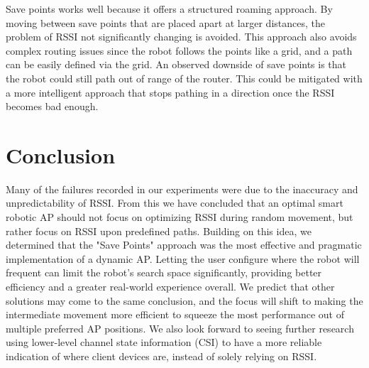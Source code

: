 Save points works well because it offers a structured roaming approach. By moving between save points that are placed apart at larger distances, the problem of RSSI not significantly changing is avoided. This approach also avoids complex routing issues since the robot follows the points like a grid, and a path can be easily defined via the grid. An observed downside of save points is that the robot could still path out of range of the router. This could be mitigated with a more intelligent approach that stops pathing in a direction once the RSSI becomes bad enough.

\section{Conclusion}

Many of the failures recorded in our experiments were due to the inaccuracy and unpredictability of RSSI. From this we have concluded that an optimal smart robotic AP should not focus on optimizing RSSI during random movement, but rather focus on RSSI upon predefined paths. Building on this idea, we determined that the "Save Points" approach was the most effective and pragmatic implementation of a dynamic AP. Letting the user configure where the robot will frequent can limit the robot’s search space significantly, providing better efficiency and a greater real-world experience overall. We predict that other solutions may come to the same conclusion, and the focus will shift to making the intermediate movement more efficient to squeeze the most performance out of multiple preferred AP positions. We also look forward to seeing further research using lower-level channel state information (CSI) to have a more reliable indication of where client devices are, instead of solely relying on RSSI.